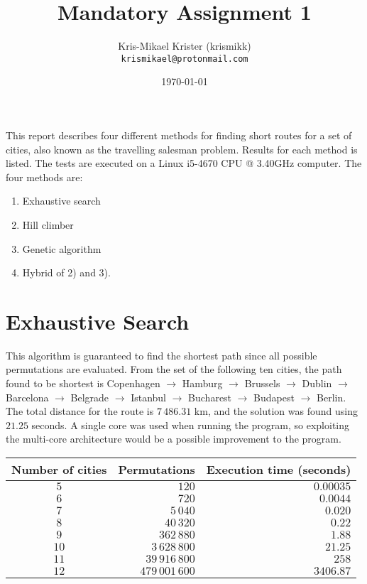 \documentclass{article}
\title{Mandatory Assignment 1}
\author{Kris-Mikael Krister (krismikk)\\\texttt{krismikael@protonmail.com}}
\date{\today}
\begin{document}
\maketitle

\noindent This report describes four different methods for finding short routes for a set of cities, also known as the travelling salesman problem. Results for each method is listed. The tests are executed on a Linux i5-4670 CPU @ 3.40GHz computer. The four methods are:

\begin{enumerate}
    \item Exhaustive search
    \item Hill climber
    \item Genetic algorithm
    \item Hybrid of 2) and 3).
\end{enumerate}

\section*{Exhaustive Search}

This algorithm is guaranteed to find the shortest path since all possible permutations are evaluated. From the set of the following ten cities, the path found to be shortest is Copenhagen $\rightarrow$ Hamburg $\rightarrow$ Brussels $\rightarrow$ Dublin $\rightarrow$ Barcelona $\rightarrow$ Belgrade $\rightarrow$ Istanbul $\rightarrow$ Bucharest $\rightarrow$ Budapest $\rightarrow$ Berlin. The total distance for the route is $7\,486.31$ km, and the solution was found using $21.25$ seconds. A single core was used when running the program, so exploiting the multi-core architecture would be a possible improvement to the program.\\

\begin{center}
\begin{tabular}{crr}
\toprule
Number of cities & Permutations & Execution time (seconds) \\
\midrule
$5$ & $120$ & $0.00035$ \\
$6$ & $720$ & $0.0044$ \\
$7$ & $5\,040$ & $0.020$ \\
$8$ & $40\,320$ & $0.22$ \\
$9$ & $362\,880$ & $1.88$ \\
$10$ & $3\,628\,800$ & $21.25$ \\
$11$ & $39\,916\,800$ & $258$ \\
$12$ & $479\,001\,600$ & $3406.87$ \\
\bottomrule
\end{tabular}
\end{center}
\end{document}
